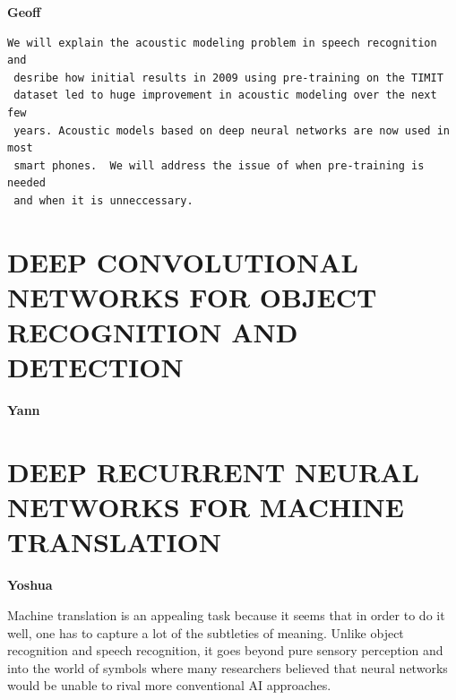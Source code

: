\documentclass{article} %
\begin{document}
{\bf Geoff}


\begin{verbatim}
We will explain the acoustic modeling problem in speech recognition and
 desribe how initial results in 2009 using pre-training on the TIMIT
 dataset led to huge improvement in acoustic modeling over the next few
 years. Acoustic models based on deep neural networks are now used in most
 smart phones.  We will address the issue of when pre-training is needed
 and when it is unneccessary.
\end{verbatim}


\section{DEEP CONVOLUTIONAL NETWORKS FOR OBJECT RECOGNITION AND DETECTION}


{\bf Yann}


\section{DEEP RECURRENT NEURAL NETWORKS FOR MACHINE TRANSLATION}


{\bf Yoshua}


Machine translation is an appealing task because it seems that in order to
do it well, one has to capture a lot of the subtleties of meaning. Unlike
object recognition and speech recognition, it goes beyond pure sensory
perception and into the world of symbols where many researchers believed
that neural networks would be unable to rival more conventional AI
approaches.
\end{document}
